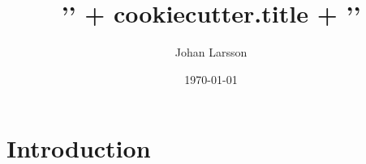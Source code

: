 \documentclass[english,a4paper]{article}
\title{{'{' + cookiecutter.title + '}'}}
\author{Johan Larsson}
\affil{The Department of Statistics, Lund University}
\date{\today}
\begin{document}
\maketitle


\section{Introduction}%
\label{introduction}

\end{document}
